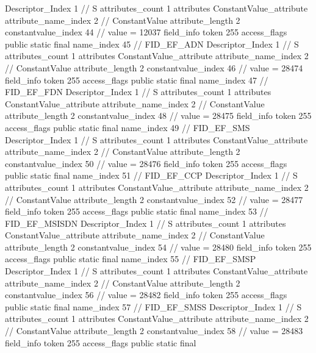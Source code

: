 {{{{{				Descriptor_Index	1		// S
				attributes_count	1
				attributes {
				ConstantValue_attribute {
					attribute_name_index	2		// ConstantValue
					attribute_length	2
					constantvalue_index	44		// value = 12037
				}
				}
			}
			field_info {
				token	255
				access_flags	public static final
				name_index	45		// FID_EF_ADN
				Descriptor_Index	1		// S
				attributes_count	1
				attributes {
				ConstantValue_attribute {
					attribute_name_index	2		// ConstantValue
					attribute_length	2
					constantvalue_index	46		// value = 28474
				}
				}
			}
			field_info {
				token	255
				access_flags	public static final
				name_index	47		// FID_EF_FDN
				Descriptor_Index	1		// S
				attributes_count	1
				attributes {
				ConstantValue_attribute {
					attribute_name_index	2		// ConstantValue
					attribute_length	2
					constantvalue_index	48		// value = 28475
				}
				}
			}
			field_info {
				token	255
				access_flags	public static final
				name_index	49		// FID_EF_SMS
				Descriptor_Index	1		// S
				attributes_count	1
				attributes {
				ConstantValue_attribute {
					attribute_name_index	2		// ConstantValue
					attribute_length	2
					constantvalue_index	50		// value = 28476
				}
				}
			}
			field_info {
				token	255
				access_flags	public static final
				name_index	51		// FID_EF_CCP
				Descriptor_Index	1		// S
				attributes_count	1
				attributes {
				ConstantValue_attribute {
					attribute_name_index	2		// ConstantValue
					attribute_length	2
					constantvalue_index	52		// value = 28477
				}
				}
			}
			field_info {
				token	255
				access_flags	public static final
				name_index	53		// FID_EF_MSISDN
				Descriptor_Index	1		// S
				attributes_count	1
				attributes {
				ConstantValue_attribute {
					attribute_name_index	2		// ConstantValue
					attribute_length	2
					constantvalue_index	54		// value = 28480
				}
				}
			}
			field_info {
				token	255
				access_flags	public static final
				name_index	55		// FID_EF_SMSP
				Descriptor_Index	1		// S
				attributes_count	1
				attributes {
				ConstantValue_attribute {
					attribute_name_index	2		// ConstantValue
					attribute_length	2
					constantvalue_index	56		// value = 28482
				}
				}
			}
			field_info {
				token	255
				access_flags	public static final
				name_index	57		// FID_EF_SMSS
				Descriptor_Index	1		// S
				attributes_count	1
				attributes {
				ConstantValue_attribute {
					attribute_name_index	2		// ConstantValue
					attribute_length	2
					constantvalue_index	58		// value = 28483
				}
				}
			}
			field_info {
				token	255
				access_flags	public static final
}}}}}
